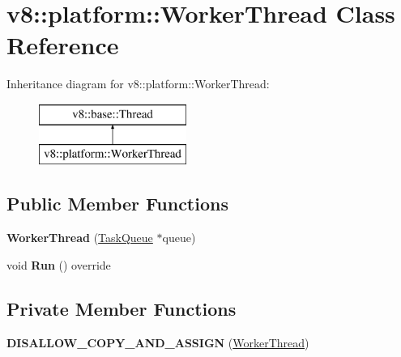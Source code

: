 \hypertarget{classv8_1_1platform_1_1_worker_thread}{}\section{v8\+:\+:platform\+:\+:Worker\+Thread Class Reference}
\label{classv8_1_1platform_1_1_worker_thread}
Inheritance diagram for v8\+:\+:platform\+:\+:Worker\+Thread\+:\begin{figure}[H]
\begin{center}
\leavevmode
\includegraphics[height=2.000000cm]{classv8_1_1platform_1_1_worker_thread}
\end{center}
\end{figure}
\subsection*{Public Member Functions}
\begin{DoxyCompactItemize}
\item 
{\bfseries Worker\+Thread} (\hyperlink{classv8_1_1platform_1_1_task_queue}{Task\+Queue} $\ast$queue)\hypertarget{classv8_1_1platform_1_1_worker_thread_ad39b924cb238ce05e0ff8740898dd09c}{}\label{classv8_1_1platform_1_1_worker_thread_ad39b924cb238ce05e0ff8740898dd09c}

\item 
void {\bfseries Run} () override\hypertarget{classv8_1_1platform_1_1_worker_thread_a229d931f339626962ce2e3e7ecdc1aa3}{}\label{classv8_1_1platform_1_1_worker_thread_a229d931f339626962ce2e3e7ecdc1aa3}

\end{DoxyCompactItemize}
\subsection*{Private Member Functions}
\begin{DoxyCompactItemize}
\item 
{\bfseries D\+I\+S\+A\+L\+L\+O\+W\+\_\+\+C\+O\+P\+Y\+\_\+\+A\+N\+D\+\_\+\+A\+S\+S\+I\+GN} (\hyperlink{classv8_1_1platform_1_1_worker_thread}{Worker\+Thread})\hypertarget{classv8_1_1platform_1_1_worker_thread_a5bced637eb0d54c34e6d1711ef486053}{}\label{classv8_1_1platform_1_1_worker_thread_a5bced637eb0d54c34e6d1711ef486053}

\end{DoxyCompactItemize}
